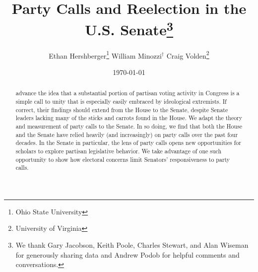 \documentclass[12pt]{article}
\begin{document}


\title{Party Calls and Reelection in the U.S. Senate\thanks{
We thank Gary Jacobson, Keith Poole, Charles Stewart,
and Alan Wiseman for generously sharing data
and Andrew Podob for helpful comments and conversations.
}
}

\author{
Ethan Hershberger\thanks{
  \small Ohio State University
}\quad
William Minozzi$^\dagger$\quad
Craig Volden\thanks{
  \small University of Virginia
}\\
}

\date{\today}

\maketitle

\thispagestyle{empty}
\setcounter{page}{0}

\begin{abstract}
\doublespacing
\noindent
\cite{Minozzi:2013} advance the idea that a substantial portion of partisan voting activity in Congress is a simple call to unity that is especially easily embraced by ideological extremists.  If correct, their findings should extend from the House to the Senate, despite Senate leaders lacking many of the sticks and carrots found in the House.  We adapt the theory and measurement of party calls to the Senate.  In so doing, we find that both the House and the Senate have relied heavily (and increasingly) on party calls over the past four decades.  In the Senate in particular, the lens of party calls opens new opportunities for scholars to explore partisan legislative behavior.  We take advantage of one such opportunity to show how electoral concerns limit Senators' responsiveness to party calls.
\end{abstract}

\clearpage

\doublespacing
\end{document}
